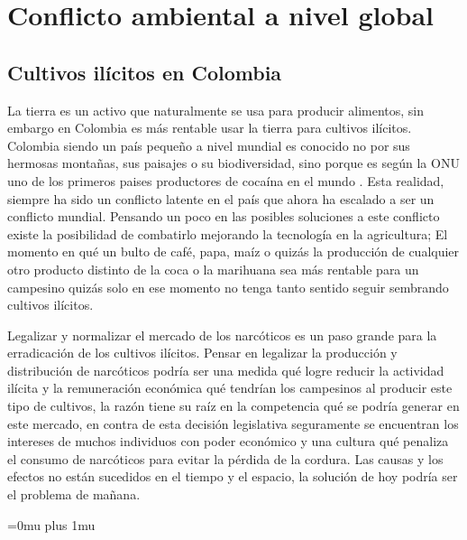 \documentclass[a4paper,man,natbib]{apa6}
\begin{document}
\section{Conflicto ambiental a nivel global}
\subsection{Cultivos ilícitos en Colombia}

La tierra es un activo que naturalmente se usa para producir alimentos, sin embargo en Colombia es más rentable usar la tierra para cultivos ilícitos. Colombia siendo un país pequeño a nivel mundial es conocido no por sus hermosas montañas, sus paisajes o su biodiversidad, sino porque es según la ONU uno de los primeros paises productores de cocaína en el mundo \citep{Informed31:online}. Esta realidad, siempre ha sido un conflicto latente en el país que ahora ha escalado a ser un conflicto mundial. Pensando un poco en las posibles soluciones a este conflicto existe la posibilidad de combatirlo mejorando la tecnología en la agricultura; El momento en qué un bulto de café,  papa, maíz o quizás la producción de cualquier otro producto distinto de la coca o la marihuana sea más rentable para un campesino quizás solo en ese momento no tenga tanto sentido seguir sembrando cultivos ilícitos.\newline

Legalizar y normalizar el mercado de los narcóticos es un paso grande para la erradicación de los cultivos ilícitos. Pensar en legalizar la producción y distribución de narcóticos podría ser una medida qué logre reducir la actividad ilícita y la remuneración económica qué tendrían los campesinos al producir este tipo de cultivos, la razón tiene su raíz en la competencia qué se podría generar en este mercado, en contra de esta decisión legislativa seguramente se encuentran los intereses de muchos individuos con poder económico y una cultura qué penaliza el consumo de narcóticos para evitar la pérdida de la cordura. Las causas y los efectos no están sucedidos en el tiempo y el espacio, la solución de hoy podría ser el problema de mañana.\newline


\Urlmuskip=0mu plus 1mu\relax


\end{document}
